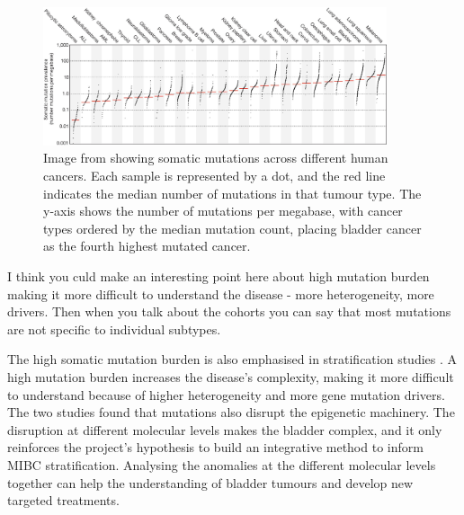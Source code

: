 \begin{figure}[!t]    
    \centering
\includegraphics[width=0.9\textwidth,height=0.9\textheight,keepaspectratio]{Sections/Lit_review/Resources/mut_sig_cancers.jpg}
    \caption[Somatic mutations across human cancers]{Image from \cite{Alexandrov2013-gi} showing somatic mutations across different human cancers. Each sample is represented by a dot, and the red line indicates the median number of mutations in that tumour type. The y-axis shows the number of mutations per megabase, with cancer types ordered by the median mutation count, placing bladder cancer as the fourth highest mutated cancer.}
    \label{fig:lit:cancer_mut_sig}
\end{figure}

I think you culd make an interesting point here about high mutation burden making it more difficult to understand the disease - more heterogeneity, more drivers. Then when you talk about the cohorts you can say that most mutations are not specific to individual subtypes.

The high somatic mutation burden is also emphasised in stratification studies \citep{Tcga2014-dr, Robertson2017-mg, Kamoun2020-tj}. A high mutation burden increases the disease's complexity, making it more difficult to understand because of higher heterogeneity and more gene mutation drivers. The two studies \citep{Tcga2014-dr, Robertson2017-mg} found that mutations also disrupt the epigenetic machinery. The disruption at different molecular levels makes the bladder complex, and it only reinforces the project's hypothesis to build an integrative method to inform MIBC stratification. Analysing the anomalies at the different molecular levels together can help the understanding of bladder tumours and develop new targeted treatments.


